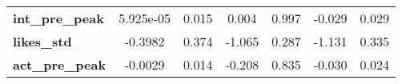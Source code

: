 \begin{center}
\begin{tabular}{lcccccc}
\textbf{int\_pre\_peak}     &    5.925e-05  &        0.015     &     0.004  &         0.997        &       -0.029    &        0.029     \\
\textbf{likes\_std}         &      -0.3982  &        0.374     &    -1.065  &         0.287        &       -1.131    &        0.335     \\
\textbf{act\_pre\_peak}     &      -0.0029  &        0.014     &    -0.208  &         0.835        &       -0.030    &        0.024     \\
\bottomrule
\end{tabular}
\end{center}